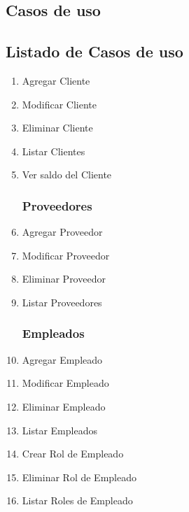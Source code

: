 \documentclass[12pt]{extarticle}
\begin{document}
\begin{spacing}{1.2}
    \clearpage
    \section{Casos de uso}
    \subsection{Listado de Casos de uso}
    \begin{multicols}{2}
    \begin{enumerate}	
        \subsubsection*{Clientes}
            \item Agregar Cliente
            \item Modificar Cliente
            \item Eliminar Cliente
            \item Listar Clientes

            \item Ver saldo del Cliente
        \subsubsection*{Proveedores}
            \item Agregar Proveedor
            \item Modificar Proveedor
            \item Eliminar Proveedor
            \item Listar Proveedores	
            \subsubsection*{Empleados}
            \item Agregar Empleado
            \item Modificar Empleado
            \item Eliminar Empleado
            \item Listar Empleados	
            \item Crear Rol de Empleado
            \item Eliminar Rol de Empleado
            \item Listar Roles de Empleado

\end{enumerate}
\end{multicols}
\end{spacing}
\end{document}
